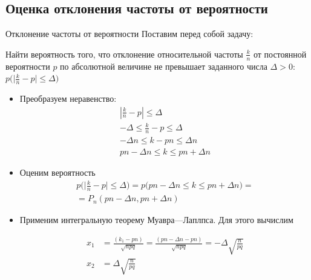 \documentclass[unicode,11pt,notheorems,xcolor=table]{beamer}
\begin{document}
\subsection{Оценка отклонения частоты от вероятности}
\begin{frame}[allowframebreaks]{Отклонение частоты от вероятности}{}
    Поставим перед собой задачу:
    \begin{block}{}
        Найти вероятность того, что отклонение относительной частоты $\frac{k}{n}$ от постоянной вероятности $p$ по абсолютной величине не превышает заданного числа $\Delta>0$:
    \qquad$ p\Big( \big|\tfrac{k}{n} - p \big| \leqslant \Delta \Big)$
    \end{block}
    \begin{itemize}
        \item Преобразуем неравенство:
        \begin{gather*}
            \left| \frac{k}{n} - p \right| \leqslant \Delta\\
            -\Delta \leqslant \frac{k}{n} - p \leqslant \Delta\\
            -\Delta n \leqslant k - pn \leqslant \Delta n\\
            pn-\Delta n \leqslant k \leqslant pn+\Delta n
        \end{gather*}
        \item Оценим вероятность
        \begin{multline*}
            p\Big( \big|\tfrac{k}{n} - p \big| \leqslant \Delta \Big) 
            = p\Big( pn-\Delta n \leqslant k \leqslant pn+\Delta n \Big) 
            =\\
            = P_n(pn-\Delta n, pn+\Delta n) 
        \end{multline*}
         \item Применим интегральную теорему Муавра---Лаплпса. Для этого вычислим 
         
         \begin{align*}
            x_1 
            &= \frac{(k_1-pn)}{\sqrt{npq}}
            = \frac{(pn-\Delta n-pn)}{\sqrt{npq}}
            = -\Delta \sqrt{\frac{n}{pq}}\\
            x_2
            &= \Delta \sqrt{\frac{n}{pq}}
         \end{align*}
         

\end{itemize}
\end{frame}
\end{document}
